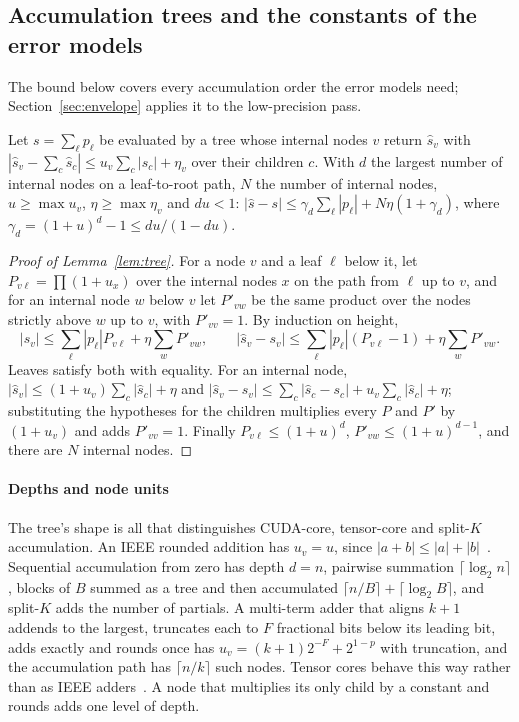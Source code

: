 \subsection{Accumulation trees and the constants of the error models}\label{app:accumulation}
The bound below covers every accumulation order the error models need; Section~\ref{sec:envelope} applies it to the low-precision pass.
\begin{lemma}\label{lem:tree}
Let $s=\sum_\ell p_\ell$ be evaluated by a tree whose internal nodes $v$ return $\hat s_v$ with $|\hat s_v-\sum_c\hat s_c|\le u_v\sum_c|\hat s_c|+\eta_v$ over their children $c$. With $d$ the largest number of internal nodes on a leaf-to-root path, $N$ the number of internal nodes, $u\ge\max u_v$, $\eta\ge\max\eta_v$ and $du<1$: $|\hat s-s|\le\gamma_d\sum_\ell|p_\ell|+N\eta(1+\gamma_d)$, where $\gamma_d=(1+u)^d-1\le du/(1-du)$.
\end{lemma}
\begin{proof}[Proof of Lemma~\ref{lem:tree}]
For a node $v$ and a leaf $\ell$ below it, let $P_{v\ell}=\prod(1+u_x)$ over the internal nodes $x$ on the path from $\ell$ up to $v$, and for an internal node $w$ below $v$ let $P'_{vw}$ be the same product over the nodes strictly above $w$ up to $v$, with $P'_{vv}=1$. By induction on height,
\[|\hat s_v|\le\sum_\ell|p_\ell|P_{v\ell}+\eta\sum_wP'_{vw},\qquad|\hat s_v-s_v|\le\sum_\ell|p_\ell|(P_{v\ell}-1)+\eta\sum_wP'_{vw}.\]
Leaves satisfy both with equality. For an internal node, $|\hat s_v|\le(1+u_v)\sum_c|\hat s_c|+\eta$ and $|\hat s_v-s_v|\le\sum_c|\hat s_c-s_c|+u_v\sum_c|\hat s_c|+\eta$; substituting the hypotheses for the children multiplies every $P$ and $P'$ by $(1+u_v)$ and adds $P'_{vv}=1$. Finally $P_{v\ell}\le(1+u)^d$, $P'_{vw}\le(1+u)^{d-1}$, and there are $N$ internal nodes.
\end{proof}

\paragraph{Depths and node units} The tree's shape is all that distinguishes CUDA-core, tensor-core and split-$K$ accumulation. An IEEE rounded addition has $u_v=u$, since $|a+b|\le|a|+|b|$~\cite{higham2002}. Sequential accumulation from zero has depth $d=n$, pairwise summation $\lceil\log_2n\rceil$, blocks of $B$ summed as a tree and then accumulated $\lceil n/B\rceil+\lceil\log_2B\rceil$, and split-$K$ adds the number of partials. A multi-term adder that aligns $k+1$ addends to the largest, truncates each to $F$ fractional bits below its leading bit, adds exactly and rounds once has $u_v=(k+1)2^{-F}+2^{1-p}$ with truncation, and the accumulation path has $\lceil n/k\rceil$ such nodes. Tensor cores behave this way rather than as IEEE adders~\cite{fasi2021}. A node that multiplies its only child by a constant and rounds adds one level of depth.

